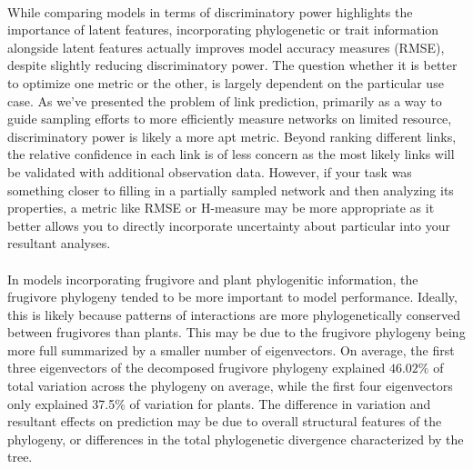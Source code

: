 \paragraph*{} 
While comparing models in terms of discriminatory power highlights the importance of latent features, incorporating phylogenetic or trait information alongside latent features actually improves model accuracy measures (RMSE), despite slightly reducing discriminatory power. The question whether it is better to optimize one metric or the other, is largely dependent on the particular use case. As we've presented the problem of link prediction, primarily as a way to guide sampling efforts to more efficiently measure networks on limited resource, discriminatory power is likely a more apt metric. Beyond ranking different links, the relative confidence in each link is of less concern as the most likely links will be validated with additional observation data. However, if your task was something closer to filling in a partially sampled network and then analyzing its properties, a metric like RMSE or H-measure\cite{hand2009measuring} may be more appropriate as it better allows you to directly incorporate uncertainty about particular into your resultant analyses. 


\paragraph*{} In models incorporating frugivore and plant phylogenitic information, the frugivore phylogeny tended to be more important to model performance. Ideally, this is likely because patterns of interactions are more phylogenetically conserved between frugivores than plants. This may be due to the frugivore phylogeny being more full summarized by a smaller number of eigenvectors. On average, the first three eigenvectors of the decomposed frugivore phylogeny explained $46.02\%$ of total variation across the phylogeny on average, while the first four eigenvectors only explained 37.5\% of variation for plants.%
The difference in variation and resultant effects on prediction may be due to overall structural features of the phylogeny, or differences in the total phylogenetic divergence characterized by the tree.

